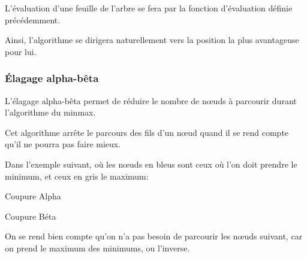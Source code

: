 L'évaluation d'une feuille de l'arbre se fera par la fonction
d'évaluation définie précédemment.

Ainsi, l'algorithme se dirigera naturellement vers la position la plus
avantageuse pour lui.

\subsubsection{Élagage alpha-bêta}
L'élagage alpha-bêta permet de réduire le nombre de nœuds à parcourir durant
l'algorithme du minmax.

Cet algorithme arrête le parcours des fils d'un nœud quand il se rend
compte qu'il ne pourra pas faire mieux.

Dans l'exemple suivant, où les nœuds en bleus sont ceux où l'on doit prendre
le minimum, et ceux en gris le maximum:
\begin{multicols}{2}\begin{center}

  Coupure Alpha


  Coupure Béta
\end{center}\end{multicols}

On se rend bien compte qu'on n'a pas besoin de parcourir les nœuds suivant,
car on prend le maximum des minimums, ou l'inverse.

